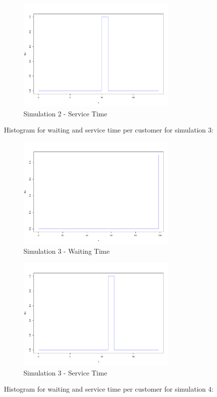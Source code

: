 \begin{figure}[H]
	\centering
  \includegraphics[width=0.7\textwidth]{serie_02/data/Simulation2/service_time.pdf}
	\caption{Simulation 2 - Service Time}
	\label{fig3}
\end{figure}
\newpage
Histogram for waiting and service time per customer for simulation $3$:\\

\begin{figure}[H]
	\centering
  \includegraphics[width=0.7\textwidth]{serie_02/data/Simulation3/waiting_time.pdf}
	\caption{Simulation 3 - Waiting Time}
	\label{fig3}
\end{figure}

\begin{figure}[H]
	\centering
  \includegraphics[width=0.7\textwidth]{serie_02/data/Simulation3/service_time.pdf}
	\caption{Simulation 3 - Service Time}
	\label{fig3}
\end{figure}
\newpage
Histogram for waiting and service time per customer for simulation $4$:\\

